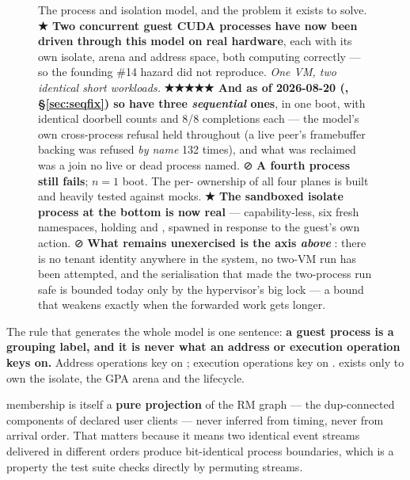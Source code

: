 \documentclass[10.5pt]{article}
\begin{document}
\begin{landscape}\begin{figure}[p]
\centering
{}
\caption{The process and isolation model, and the problem it exists to solve. \textbf{★ Two
concurrent guest CUDA processes have now been driven through this model on real hardware}, each
with its own isolate, arena and address space, both computing correctly — so the founding \#14
hazard did not reproduce. \emph{One VM, two identical short workloads.} \textbf{★★★★★ And as of
2026-08-20 (, \S\ref{sec:seqfix}) so have three \emph{sequential} ones}, in one boot,
with identical doorbell counts and 8/8 completions each — the model's own cross-process refusal
held throughout (a live peer's framebuffer backing was refused \emph{by name} 132 times), and what
was reclaimed was a join no live or dead process named. ⊘ \textbf{A fourth process still fails};
$n = 1$ boot. The per-
ownership of all four planes is built and heavily tested against mocks. \textbf{★ The sandboxed
isolate process at the bottom is now real} — capability-less, six fresh namespaces, holding
 and , spawned in response to the guest's own action. ⊘
\textbf{What remains unexercised is the axis \emph{above} }: there is no tenant
identity anywhere in the system, no two-VM run has been attempted, and the serialisation that
made the two-process run safe is bounded today only by the hypervisor's big lock — a bound that
weakens exactly when the forwarded work gets longer.}
\label{fig:isolation}
\end{figure}\end{landscape}

The rule that generates the whole model is one sentence: \textbf{a guest process is a grouping
label, and it is never what an address or execution operation keys on.} Address operations key
on ; execution operations key on .  exists
only to own the isolate, the GPA arena and the lifecycle.

 membership is itself a \textbf{pure projection} of the RM graph — the
dup-connected components of declared user clients — never inferred from timing, never from
arrival order. That matters because it means two identical event streams delivered in different
orders produce bit-identical process boundaries, which is a property the test suite checks
directly by permuting streams.
\end{document}
